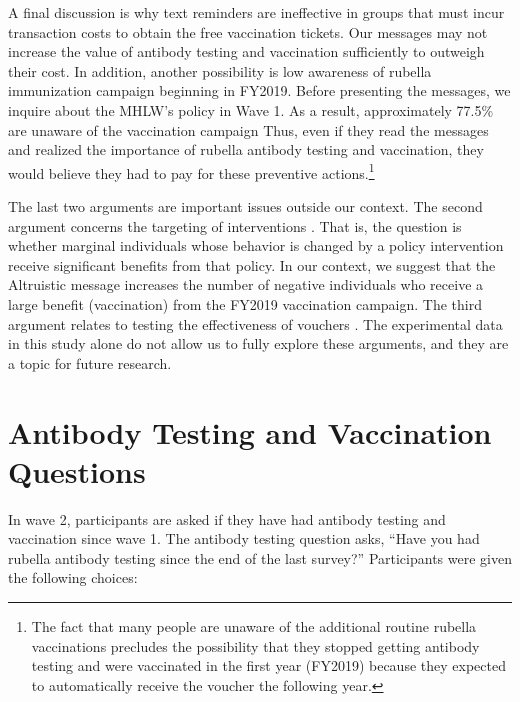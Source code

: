 \documentclass[
]{article}
\begin{document}
A final discussion is why text reminders are ineffective in groups that must incur transaction costs to obtain the free vaccination tickets. Our messages may not increase the value of antibody testing and vaccination sufficiently to outweigh their cost. In addition, another possibility is low awareness of rubella immunization campaign beginning in FY2019. Before presenting the messages, we inquire about the MHLW's policy in Wave 1. As a result, approximately 77.5\% are unaware of the vaccination campaign Thus, even if they read the messages and realized the importance of rubella antibody testing and vaccination, they would believe they had to pay for these preventive actions.\footnote{The fact that many people are unaware of the additional routine rubella vaccinations precludes the possibility that they stopped getting antibody testing and were vaccinated in the first year (FY2019) because they expected to automatically receive the voucher the following year.}

The last two arguments are important issues outside our context. The second argument concerns the targeting of interventions \citep[e.g.,][]{Finkelstein2019}. That is, the question is whether marginal individuals whose behavior is changed by a policy intervention receive significant benefits from that policy. In our context, we suggest that the Altruistic message increases the number of negative individuals who receive a large benefit (vaccination) from the FY2019 vaccination campaign. The third argument relates to testing the effectiveness of vouchers \citep[e.g.,][]{Kacker2022}. The experimental data in this study alone do not allow us to fully explore these arguments, and they are a topic for future research.

\clearpage

\hypertarget{appendix-appendix}{%
\appendix}


\hypertarget{question}{%
\section{Antibody Testing and Vaccination Questions}\label{question}}

In wave 2, participants are asked if they have had antibody testing and vaccination since wave 1. The antibody testing question asks, ``Have you had rubella antibody testing since the end of the last survey?''
Participants were given the following choices:
\end{document}
